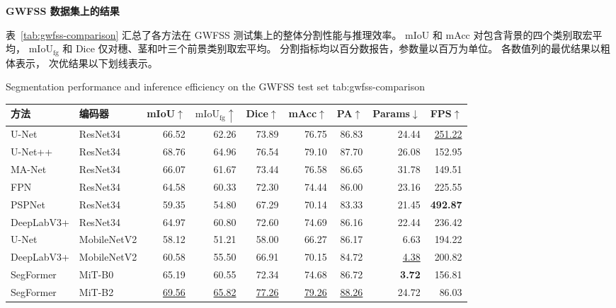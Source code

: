 \medskip\noindent\textbf{GWFSS 数据集上的结果}\par
\label{sec:exp-gwfss}

表~\ref{tab:gwfss-comparison} 汇总了各方法在 GWFSS
测试集上的整体分割性能与推理效率。
mIoU 和 mAcc 对包含背景的四个类别取宏平均，
\(\mathrm{mIoU}_{\mathrm{fg}}\) 和 Dice
仅对穗、茎和叶三个前景类别取宏平均。
分割指标均以百分数报告，参数量以百万为单位。
各数值列的最优结果以粗体表示，
次优结果以下划线表示。

\begin{table}[!htb]
  \centering
    {Segmentation performance and inference efficiency on the GWFSS test set}
    {tab:gwfss-comparison}
  \begin{spacing}{1.2}
    \small
    \setlength{\tabcolsep}{2pt}
    \renewcommand{\arraystretch}{1.15}
    \begin{tabular*}{\linewidth}{@{\extracolsep{\fill}}llrrrrrrr@{}}
      \toprule
      方法 & 编码器 & mIoU\(\uparrow\) & \(\mathrm{mIoU}_{\mathrm{fg}}\uparrow\)
        & Dice\(\uparrow\) & mAcc\(\uparrow\) & PA\(\uparrow\)
        & Params\(\downarrow\) & FPS\(\uparrow\) \\
      \midrule
      U-Net & ResNet34 & 66.52 & 62.26 & 73.89 & 76.75 & 86.83 & 24.44 & \underline{251.22} \\
      U-Net++ & ResNet34 & 68.76 & 64.96 & 76.54 & 79.10 & 87.70 & 26.08 & 152.95 \\
      MA-Net & ResNet34 & 66.07 & 61.67 & 73.44 & 76.58 & 86.65 & 31.78 & 149.51 \\
      FPN & ResNet34 & 64.58 & 60.33 & 72.30 & 74.44 & 86.00 & 23.16 & 225.55 \\
      PSPNet & ResNet34 & 59.35 & 54.80 & 67.29 & 70.14 & 83.33 & 21.45 & \textbf{492.87} \\
      DeepLabV3+ & ResNet34 & 64.97 & 60.80 & 72.60 & 74.69 & 86.16 & 22.44 & 236.42 \\
      U-Net & MobileNetV2 & 58.12 & 51.21 & 58.00 & 66.27 & 86.17 & 6.63 & 194.22 \\
      DeepLabV3+ & MobileNetV2 & 60.58 & 55.50 & 66.91 & 70.15 & 84.72 & \underline{4.38} & 200.82 \\
      SegFormer & MiT-B0 & 65.19 & 60.55 & 72.34 & 74.68 & 86.72 & \textbf{3.72} & 156.81 \\
      SegFormer & MiT-B2 & \underline{69.56} & \underline{65.82}
        & \underline{77.26} & \underline{79.26} & \underline{88.26} & 24.72 & 86.03 \\

\end{tabular*}
\end{spacing}
\end{table}
